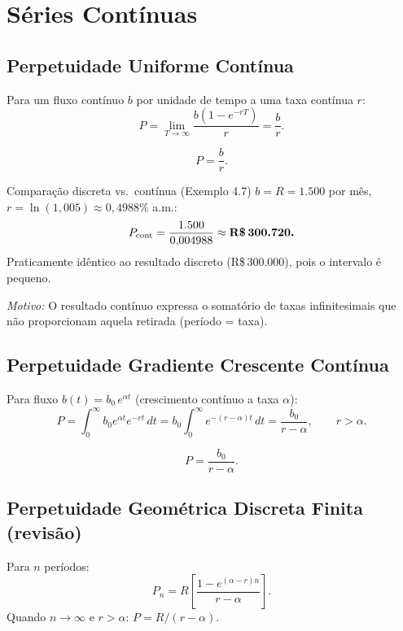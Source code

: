 \section{Séries Contínuas}

\subsection{Perpetuidade Uniforme Contínua}

Para um fluxo contínuo $b$ por unidade de tempo a uma taxa contínua $r$:
\[
  P = \lim_{T\to\infty} \frac{b(1-e^{-rT})}{r} = \frac{b}{r}.
\]

\begin{resultado}
\[
  P = \frac{b}{r}.
\]
\end{resultado}

\begin{exemplo}{Comparação discreta vs.\ contínua (Exemplo 4.7)}
$b = R = 1{.}500$ por mês, $r = \ln(1{,}005) \approx 0{,}4988\%$ a.m.:
\[
  P_{\text{cont}} = \frac{1{.}500}{0{,}004988} \approx \textbf{R\$\,300.720.}
\]
Praticamente idêntico ao resultado discreto (R\$\,300.000), pois o intervalo é pequeno.

\smallskip
\textit{Motivo:} O resultado contínuo expressa o somatório de taxas infinitesimais que não proporcionam aquela retirada (período = taxa).
\end{exemplo}

\subsection{Perpetuidade Gradiente Crescente Contínua}

Para fluxo $b(t) = b_0 \, e^{\alpha t}$ (crescimento contínuo a taxa $\alpha$):
\[
  P = \int_0^\infty b_0 e^{\alpha t} e^{-rt}\,dt
    = b_0 \int_0^\infty e^{-(r-\alpha)t}\,dt
    = \frac{b_0}{r - \alpha}, \qquad r > \alpha.
\]

\begin{resultado}
\[
  P = \frac{b_0}{r - \alpha}.
\]
\end{resultado}

\subsection{Perpetuidade Geométrica Discreta Finita (revisão)}

Para $n$ períodos:
\[
  P_n = R\left[\frac{1 - e^{(\alpha-r)n}}{r - \alpha}\right].
\]
Quando $n\to\infty$ e $r>\alpha$: $P = R/(r-\alpha)$.

